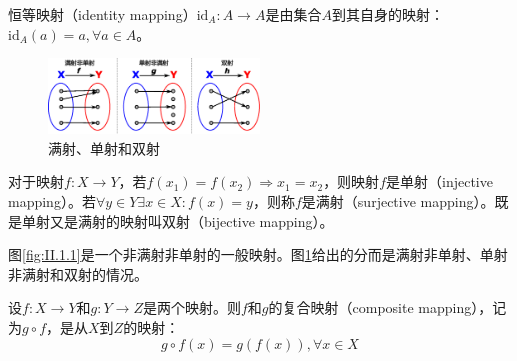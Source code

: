 \documentclass[main.tex]{subfiles}
\begin{document}
\begin{definition}[恒等映射]
恒等映射（identity mapping）$\mathrm{id}_A:A\rightarrow A$是由集合$A$到其自身的映射：$\mathrm{id}_A\left(a\right)=a,\forall a\in A$。
\end{definition}

\begin{figure}[htbp]
\centering
\includegraphics[width=0.5\textwidth]{images/II.1.2.eps}
\caption{满射、单射和双射}
\label{fig:II.1.2}
\end{figure}

\begin{definition}[单射、双射、满射]
对于映射$f:X\rightarrow Y$，若$f\left(x_1\right)=f\left(x_2\right)\Rightarrow x_1=x_2$，则映射$f$是单射（injective mapping）。若$\forall y\in Y\exists x\in X:f\left(x\right)=y$，则称$f$是满射（surjective mapping）。既是单射又是满射的映射叫双射（bijective mapping）。
\end{definition}

图\ref{fig:II.1.1}是一个非满射非单射的一般映射。图\ref{fig:II.1.2}给出的分而是满射非单射、单射非满射和双射的情况。

\begin{definition}[复合映射]
设$f:X\rightarrow Y$和$g:Y\rightarrow Z$是两个映射。则$f$和$g$的复合映射（composite mapping），记为$g\circ f$，是从$X$到$Z$的映射：
\[g\circ f\left(x\right)=g\left(f\left(x\right)\right),\forall x\in X\]
\end{definition}
\end{document}
